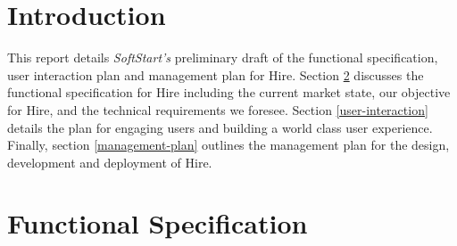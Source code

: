 \documentclass[11pt]{article}
\begin{document}
    
    
\setcounter{page}{1}
\glsresetall
\renewcommand{\arraystretch}{1.5} %
    
        
%
\section{Introduction}\label{introduction}


This report details \textit{SoftStart's} preliminary draft of the functional specification, user interaction plan and management plan for Hire. Section \ref{functional-spec} discusses the functional specification for Hire including the current market state, our objective for Hire, and the technical requirements we foresee. Section \ref{user-interaction} details the plan for engaging users and building a world class user experience. Finally, section \ref{management-plan} outlines the management plan for the design, development and deployment of Hire.

%
\section{Functional Specification}\label{functional-spec}

\end{document}
